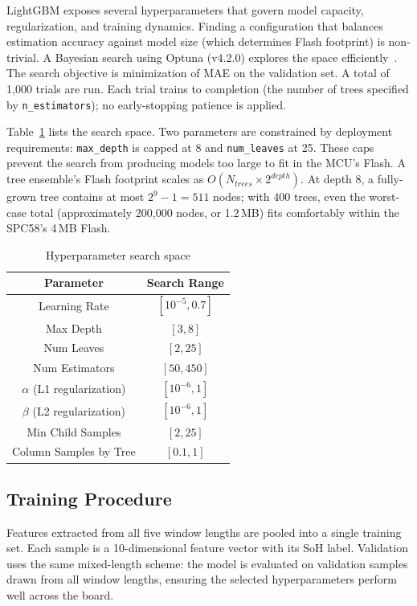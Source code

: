 LightGBM exposes several hyperparameters that govern model capacity, regularization, and training dynamics. Finding a configuration that balances estimation accuracy against model size (which determines Flash footprint) is non-trivial. A Bayesian search using Optuna (v4.2.0) explores the space efficiently~\autocite{akiba2019}. The search objective is minimization of MAE on the validation set. A total of 1{,}000 trials are run. Each trial trains to completion (the number of trees specified by \texttt{n\_estimators}); no early-stopping patience is applied.

Table~\ref{tab:hp_space} lists the search space. Two parameters are constrained by deployment requirements: \texttt{max\_depth} is capped at 8 and \texttt{num\_leaves} at 25. These caps prevent the search from producing models too large to fit in the MCU's Flash. A tree ensemble's Flash footprint scales as $O(N_{trees} \times 2^{depth})$. At depth 8, a fully-grown tree contains at most $2^9 - 1 = 511$ nodes; with 400 trees, even the worst-case total (approximately 200{,}000 nodes, or 1.2\,MB) fits comfortably within the SPC58's 4\,MB Flash.

\begin{table}[H]
    \centering
    \setcellgapes{3pt}
    \makegapedcells
    \begin{tabular}{c c}
    \hline
    Parameter & Search Range \\
    \hline
    Learning Rate & $[10^{-5}, 0.7]$ \\
    Max Depth & $[3, 8]$ \\
    Num Leaves & $[2, 25]$ \\
    Num Estimators & $[50, 450]$ \\
    $\alpha$ (L1 regularization) & $[10^{-6}, 1]$ \\
    $\beta$ (L2 regularization) & $[10^{-6}, 1]$ \\
    Min Child Samples & $[2, 25]$ \\
    Column Samples by Tree & $[0.1, 1]$ \\
    \hline
    \end{tabular}
    \caption{Hyperparameter search space}
    \label{tab:hp_space}
\end{table}

\subsection{Training Procedure}

Features extracted from all five window lengths are pooled into a single training set. Each sample is a 10-dimensional feature vector with its SoH label. Validation uses the same mixed-length scheme: the model is evaluated on validation samples drawn from all window lengths, ensuring the selected hyperparameters perform well across the board.

